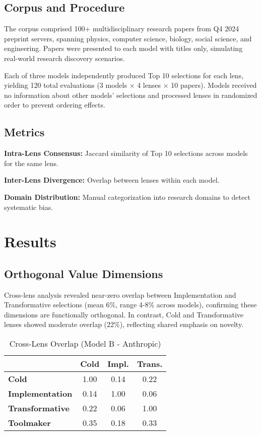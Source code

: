 \documentclass{article}
\begin{document}
\subsection{Corpus and Procedure}

The corpus comprised 100+ multidisciplinary research papers from Q4 2024 preprint servers, spanning physics, computer science, biology, social science, and engineering. Papers were presented to each model with titles only, simulating real-world research discovery scenarios.

Each of three models independently produced Top 10 selections for each lens, yielding 120 total evaluations (3 models × 4 lenses × 10 papers). Models received no information about other models' selections and processed lenses in randomized order to prevent ordering effects.

\subsection{Metrics}

\textbf{Intra-Lens Consensus:} Jaccard similarity of Top 10 selections across models for the same lens.

\textbf{Inter-Lens Divergence:} Overlap between lenses within each model.

\textbf{Domain Distribution:} Manual categorization into research domains to detect systematic bias.

\section{Results}

\subsection{Orthogonal Value Dimensions}

Cross-lens analysis revealed near-zero overlap between Implementation and Transformative selections (mean 6\%, range 4-8\% across models), confirming these dimensions are functionally orthogonal. In contrast, Cold and Transformative lenses showed moderate overlap (22\%), reflecting shared emphasis on novelty.

\begin{table}[h]
\centering
\caption{Cross-Lens Overlap (Model B - Anthropic)}
\begin{tabular}{lccc}
\toprule
& \textbf{Cold} & \textbf{Impl.} & \textbf{Trans.} \\
\midrule
\textbf{Cold} & 1.00 & 0.14 & 0.22 \\
\textbf{Implementation} & 0.14 & 1.00 & 0.06 \\
\textbf{Transformative} & 0.22 & 0.06 & 1.00 \\
\textbf{Toolmaker} & 0.35 & 0.18 & 0.33 \\
\bottomrule
\end{tabular}
\end{table}
\end{document}
